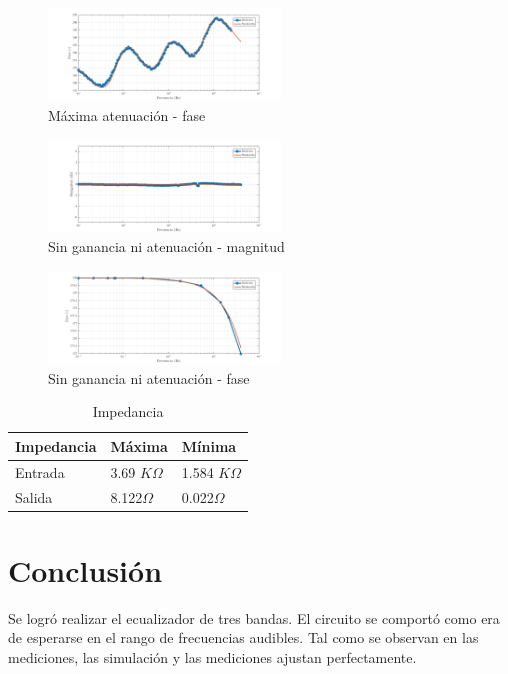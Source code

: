 \documentclass[../../tc_tp3_main.tex]{subfiles}
\begin{document}
\begin{figure}[H]
\centering
\includegraphics[width=0.55\textwidth]{imagenes/min_f.png}
\caption{M\'axima atenuación - fase} 
\end{figure}

\begin{figure}[H]
\centering
\includegraphics[width=0.55\textwidth]{imagenes/med_m.png}
\caption{Sin ganancia ni atenuación - magnitud} 
\end{figure}

\begin{figure}[H]
\centering
\includegraphics[width=0.55\textwidth]{imagenes/med_ff.png}
\caption{Sin ganancia ni atenuación - fase} 
\end{figure}

\begin{table}[h]
\begin{center}
\begin{tabular}{|l|l|l|}
\hline
Impedancia & M\'axima & M\'inima \\
\hline \hline
Entrada& 3.69 $K \Omega$  &1.584 $K \Omega$ \\ \hline
Salida&8.122$\Omega$  &0.022$\Omega$  \\ \hline


\end{tabular}
\caption{Impedancia} 
\label{tab:MImp}
\end{center}
\end{table}
\section{Conclusión}
Se logró realizar el ecualizador de tres bandas. El circuito se comportó como era de esperarse en el rango de frecuencias audibles. Tal como se observan en las mediciones, las simulación y las mediciones ajustan perfectamente.


\end{document}
